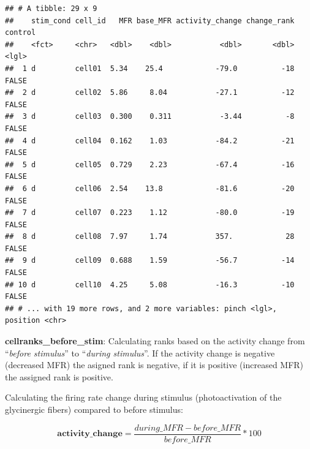 \documentclass[12pt,]{article}
\newenvironment{Shaded}{\begin{snugshade}}{\end{snugshade}}
\newcommand{\DataTypeTok}[1]{\textcolor[rgb]{0.13,0.29,0.53}{#1}}
\newcommand{\DecValTok}[1]{\textcolor[rgb]{0.00,0.00,0.81}{#1}}
\newcommand{\KeywordTok}[1]{\textcolor[rgb]{0.13,0.29,0.53}{\textbf{#1}}}
\newcommand{\NormalTok}[1]{#1}
\newcommand{\OperatorTok}[1]{\textcolor[rgb]{0.81,0.36,0.00}{\textbf{#1}}}
\newcommand{\StringTok}[1]{\textcolor[rgb]{0.31,0.60,0.02}{#1}}
\begin{document}
\begin{verbatim}
## # A tibble: 29 x 9
##    stim_cond cell_id   MFR base_MFR activity_change change_rank control
##    <fct>     <chr>   <dbl>    <dbl>           <dbl>       <dbl> <lgl>  
##  1 d         cell01  5.34    25.4            -79.0          -18 FALSE  
##  2 d         cell02  5.86     8.04           -27.1          -12 FALSE  
##  3 d         cell03  0.300    0.311           -3.44          -8 FALSE  
##  4 d         cell04  0.162    1.03           -84.2          -21 FALSE  
##  5 d         cell05  0.729    2.23           -67.4          -16 FALSE  
##  6 d         cell06  2.54    13.8            -81.6          -20 FALSE  
##  7 d         cell07  0.223    1.12           -80.0          -19 FALSE  
##  8 d         cell08  7.97     1.74           357.            28 FALSE  
##  9 d         cell09  0.688    1.59           -56.7          -14 FALSE  
## 10 d         cell10  4.25     5.08           -16.3          -10 FALSE  
## # ... with 19 more rows, and 2 more variables: pinch <lgl>, position <chr>
\end{verbatim}

\textbf{cellranks\_before\_stim}: Calculating ranks based on the
activity change from ``\emph{before stimulus}'' to ``\emph{during
stimulus}''. If the activity change is negative (decreased MFR) the
asigned rank is negative, if it is positive (increased MFR) the assigned
rank is positive.

Calculating the firing rate change during stimulus (photoactivation of
the glycinergic fibers) compared to before stimulus:

\[\mathbf{activity\_change} = \frac{during\_MFR - before\_MFR}{before\_MFR} * 100\]

\begin{Shaded}
\end{Shaded}
\end{document}
